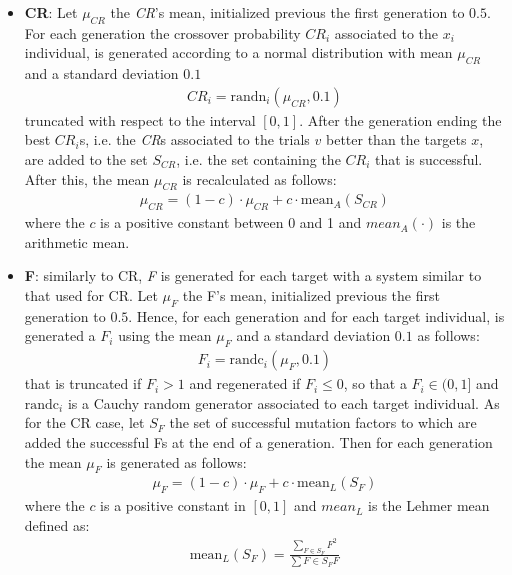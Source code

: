 \begin{itemize}
	\item{\textbf{CR}: Let $\mu_{\textit{CR}}$ the \textit{CR}'s mean, initialized previous the first generation to $0.5$. For each generation the crossover probability $\textit{CR}_{i}$ associated to the $x_{i}$ individual, is generated according to a normal distribution with mean $\mu_{CR}$ and a standard deviation $0.1$
	\begin{align}
		\textit{CR}_{i} = \textrm{randn}_{i}(\mu_{\textit{CR}}, 0.1)
	\end{align}
	truncated with respect to the interval $[0, 1]$. \newline\newline
	After the generation ending the best $\textit{CR}_{i}$s, i.e. the \textit{CR}s associated to the trials $v$ better than the targets $x$, are added to the set $S_{\textit{CR}}$, i.e. the set containing the $\textit{CR}_{i}$ that is successful. After this, the mean $\mu_{\textit{CR}}$ is recalculated as follows:
	\begin{align}
		\mu_{\textit{CR}} = (1 - c)\cdot\mu_{\textit{CR}} + c\cdot\textrm{mean}_{A}(S_{\textit{CR}})
	\end{align}
	where the $c$ is a positive constant between 0 and 1 and $mean_{A}(\cdot)$ is the arithmetic mean.	
	}
	\item{\textbf{F}: similarly to CR, \textit{F} is generated for each target with a system similar to that used for CR. Let $\mu_{F}$ the F's mean, initialized previous the first generation to $0.5$. Hence, for each generation and for each target individual, is generated a $F_{i}$ using the mean $\mu_{F}$ and a standard deviation $0.1$ as follows:
		\begin{align}
			F_{i} = \textrm{randc}_{i}(\mu_{F}, 0.1)
		\end{align}
		that is truncated if $F_{i} > 1$ and regenerated if $F_{i} \leq 0$, so that a $F_{i} \in (0, 1]$ and $\textrm{randc}_{i}$ is a Cauchy random generator associated to each target individual.\newline\newline
As for the CR case, let $S_{\textit{F}}$ the set of successful mutation factors to which are added the successful Fs at the end of a generation. Then for each generation the mean $\mu_{F}$ is generated as follows:
		\begin{align}
			\mu_{F} = (1 - c)\cdot\mu_{F} + c\cdot\textrm{mean}_{L}(S_{F})
		\end{align}
		where the $c$ is a positive constant in $[0, 1]$ and $\textit{mean}_{L}$ is the Lehmer mean defined as:
		\begin{align}
			\textrm{mean}_{L}(S_{F}) = \frac{\sum_{F \in S_{F}}F^{2}}{\sum\limits{F \in S_{F}}F} 
		\end{align}
		}
\end{itemize}

